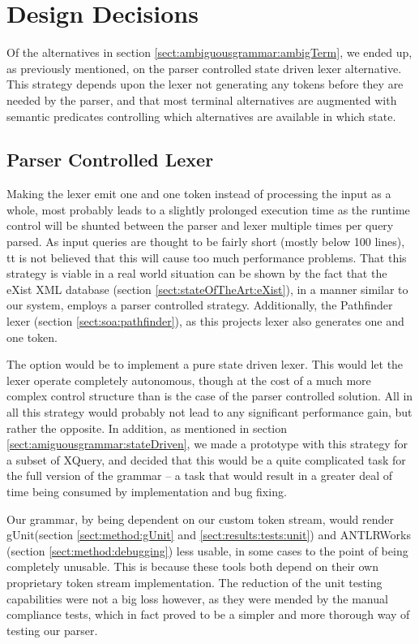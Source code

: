 \section{Design Decisions}
\label{sect:discussion:designDecisions}

Of the alternatives in section \ref{sect:ambiguousgrammar:ambigTerm}, we ended up, as previously mentioned, on the parser controlled state driven lexer alternative. This strategy depends upon the lexer not generating any tokens before they are needed by the parser, and that most terminal alternatives are augmented with semantic predicates controlling which alternatives are available in which state.

\subsection{Parser Controlled Lexer}
Making the lexer emit one and one token instead of processing the input as a
whole, most probably leads to a slightly prolonged execution time as the
runtime control will be shunted between the parser and lexer multiple times
per query parsed. As input queries are thought to be fairly short (mostly below 100
lines), tt is not believed that this will cause too much performance 
problems. That this strategy is viable in a real world situation can be shown by
the fact that the eXist XML database (section \ref{sect:stateOfTheArt:eXist}), in
a manner similar to our system, employs a parser controlled strategy.
Additionally, the Pathfinder lexer (section \ref{sect:soa:pathfinder}), as this projects lexer also
generates one and one token.

The option would be to implement a pure state driven lexer. This would let the
lexer operate completely autonomous, though at the cost of a much more complex
control structure than is the case of the parser controlled solution. All in
all this strategy would probably not lead to any significant performance gain,
but rather the opposite. In addition, as mentioned in section
\ref{sect:amiguousgrammar:stateDriven}, we made a prototype with this strategy
for a subset of XQuery, and decided that this would be a quite complicated task
for the full version of the grammar -- a task that would result in a greater
deal of time being consumed by implementation and bug fixing.

Our grammar, by being dependent on our custom token stream, would render
gUnit(section \ref{sect:method:gUnit} and \ref{sect:results:tests:unit}) and
ANTLRWorks (section \ref{sect:method:debugging}) less usable, in some cases to
the point of being completely unusable. This is because these tools both depend
on their own proprietary token stream implementation. The reduction of the unit
testing capabilities were not a big loss however, as they were mended by the
manual compliance tests, which in fact proved to be a simpler and more thorough
way of testing our parser.

